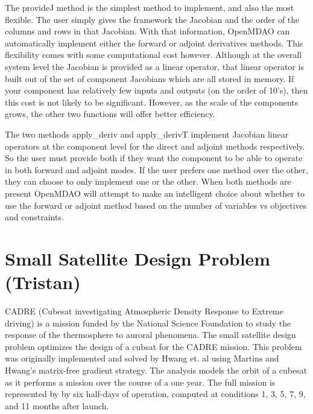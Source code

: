 \documentclass[]{aiaa-tc} %
\begin{document}
        The provideJ method is the simplest method to implement, and also the most flexible. The user simply gives the framework the
        Jacobian and the order of the columns and rows in that Jacobian. With that information, OpenMDAO can automatically
        implement either the forward or adjoint derivatives methods. This flexibility comes with some computational cost however.
        Although at the overall system level the Jacobian is provided as a linear operator, that linear operator is built out
        of the set of component Jacobians which are all stored in memory. If your component has relatively few inputs and outputs
        (on the order of 10's), then this cost is not likely to be significant. However, as the scale of the components grows,
        the other two functions will offer better efficiency.

        The two methods apply\_deriv and apply\_derivT implement Jacobian linear operators at
        the component level for the direct and adjoint methods respectively. So the user must provide both if they
        want the component to be able to operate in both forward and adjoint modes. If the user prefers one method over
        the other, they can choose to only implement one or the other. When both methods are present OpenMDAO will
        attempt to make an intelligent choice about whether to use the forward or adjoint method based on the number
        of variables vs objectives and constraints.



    \section{Small Satellite Design Problem (Tristan)}

    CADRE (Cubesat investigating Atmospheric Density Response to Extreme driving)
    is a mission funded by the National Science Foundation to study the
    response of the thermosphere to auroral phenomena\cite{cutler2011cubesat}. 
    The small satellite design problem optimizes the design of a cubsat for the CADRE mission. 
    This problem was originally implemented and solved by Hwang et. al\cite{CADRE2012} using 
    Martins and Hwang's matrix-free gradient strategy. The analysis models the orbit of a cubesat 
    as it performs a mission over the course of a one year. The full mission is represented by  
    by six half-days of operation, computed at conditions 1, 3, 5, 7, 9, and 11 months after launch. 
\end{document}

